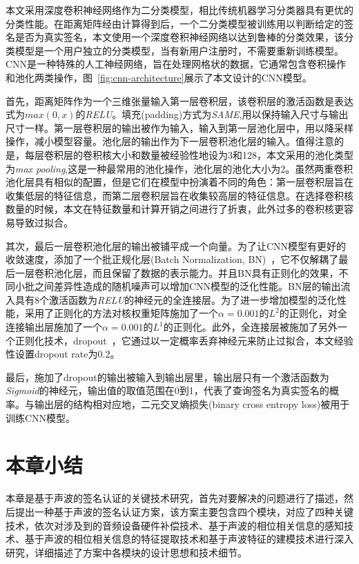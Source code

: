本文采用深度卷积神经网络作为二分类模型，相比传统机器学习分类器具有更优的分类性能。在距离矩阵经由计算得到后，一个二分类模型被训练用以判断给定的签名是否为真实签名，本文使用一个深度卷积神经网络以达到鲁棒的分类效果，该分类模型是一个用户独立的分类模型，当有新用户注册时，不需要重新训练模型。CNN是一种特殊的人工神经网络，旨在处理网格状的数据，它通常包含卷积操作和池化两类操作，图~\ref{fig:cnn-architecture}展示了本文设计的CNN模型。

首先，距离矩阵作为一个三维张量输入第一层卷积层，该卷积层的激活函数是表达式为$max(0,x)$的\textit{RELU}。填充(padding)方式为\textit{SAME},用以保持输入尺寸与输出尺寸一样。第一层卷积层的输出被作为输入，输入到第一层池化层中，用以降采样操作，减小模型容量。池化层的输出作为下一层卷积池化层的输入。值得注意的是，每层卷积层的卷积核大小和数量被经验性地设为3和128，本文采用的池化类型为\textit{max pooling},这是一种最常用的池化操作，池化层的池化大小为2。虽然两重卷积池化层具有相似的配置，但是它们在模型中扮演着不同的角色：第一层卷积层旨在收集低层的特征信息，而第二层卷积层旨在收集较高层的特征信息。在选择卷积核数量的时候，本文在特征数量和计算开销之间进行了折衷，此外过多的卷积核更容易导致过拟合。


其次，最后一层卷积池化层的输出被铺平成一个向量。为了让CNN模型有更好的收敛速度，添加了一个批正规化层(Batch Normalization, BN)~\cite{ioffe2015batch}，它不仅解耦了最后一层卷积池化层，而且保留了数据的表示能力。并且BN具有正则化的效果，不同小批之间差异性造成的随机噪声可以增加CNN模型的泛化性能。BN层的输出流入具有8个激活函数为\textit{RELU}的神经元的全连接层。为了进一步增加模型的泛化性能，采用了正则化的方法对核权重矩阵施加了一个$\alpha=0.001$的$L^2$的正则化，对全连接输出层施加了一个$\alpha=0.001$的$L^1$的正则化。此外，全连接层被施加了另外一个正则化技术，dropout~\cite{srivastava2014dropout}，它通过以一定概率丢弃神经元来防止过拟合，本文经验性设置dropout rate为0.2。

最后，施加了dropout的输出被输入到输出层里，输出层只有一个激活函数为\textit{Sigmoid}的神经元，输出值的取值范围在0到1，代表了查询签名为真实签名的概率。与输出层的结构相对应地，二元交叉熵损失(binary cross entropy loss)被用于训练CNN模型。

\section{本章小结}
本章是基于声波的签名认证的关键技术研究，首先对要解决的问题进行了描述，然后提出一种基于声波的签名认证方案，该方案主要包含四个模块，对应了四种关键技术，依次对涉及到的音频设备硬件补偿技术、基于声波的相位相关信息的感知技术、基于声波的相位相关信息的特征提取技术和基于声波特征的建模技术进行深入研究，详细描述了方案中各模块的设计思想和技术细节。


